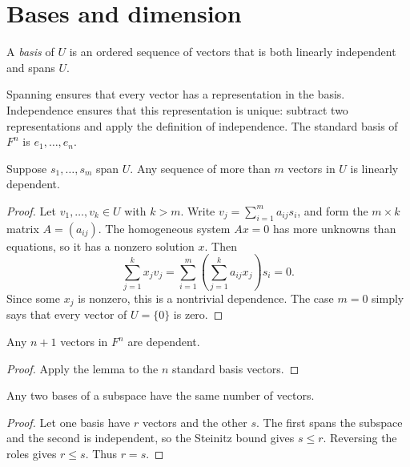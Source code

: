 
\section{Bases and dimension}

\begin{definition}
A \emph{basis} of $U$ is an ordered sequence of vectors that is both
linearly independent and spans $U$.
\end{definition}

Spanning ensures that every vector has a representation in the basis.
Independence ensures that this representation is unique: subtract two
representations and apply the definition of independence.
The standard basis of $F^n$ is $e_1,\ldots,e_n$.

\begin{lemma}
Suppose $s_1,\ldots,s_m$ span $U$. Any sequence of more than $m$ vectors
in $U$ is linearly dependent.
\end{lemma}
\begin{proof}
Let $v_1,\ldots,v_k\in U$ with $k>m$. Write
$v_j=\sum_{i=1}^m a_{ij}s_i$, and form the $m\times k$ matrix
$A=(a_{ij})$. The homogeneous system $Ax=0$ has more unknowns than
equations, so it has a nonzero solution $x$. Then
\[
 \sum_{j=1}^k x_jv_j
 =\sum_{i=1}^m\left(\sum_{j=1}^k a_{ij}x_j\right)s_i=0.
\]
Since some $x_j$ is nonzero, this is a nontrivial dependence.
The case $m=0$ simply says that every vector of $U=\{0\}$ is zero.
\end{proof}

\begin{corollary}
Any $n+1$ vectors in $F^n$ are dependent.
\end{corollary}
\begin{proof}
Apply the lemma to the $n$ standard basis vectors.
\end{proof}

\begin{theorem}
Any two bases of a subspace have the same number of vectors.
\end{theorem}
\begin{proof}
Let one basis have $r$ vectors and the other $s$.
The first spans the subspace and the second is independent, so the
Steinitz bound gives $s\leq r$. Reversing the roles gives $r\leq s$.
Thus $r=s$.
\end{proof}

